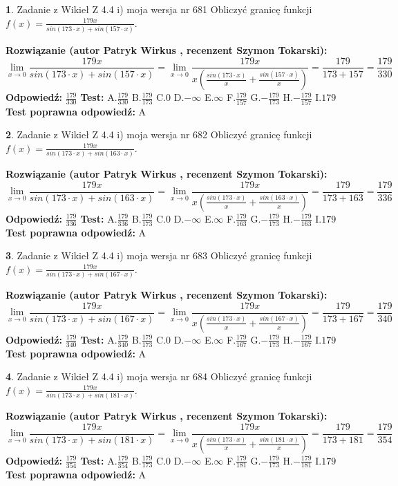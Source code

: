 \documentclass[12pt, a4paper]{article}
\theoremstyle{definition} %
\newtheorem{zad}{}
\newcommand{\zadStart}[1]{\begin{zad}#1\newline}
\newcommand{\zadStop}{\end{zad}}
\newcommand{\rozwStart}[2]{\noindent \textbf{Rozwiązanie (autor #1 , recenzent #2): }\newline}
\newcommand{\rozwStop}{\newline}
\newcommand{\odpStart}{\noindent \textbf{Odpowiedź:}\newline}
\newcommand{\odpStop}{\newline}
\newcommand{\testStart}{\noindent \textbf{Test:}\newline}
\newcommand{\testStop}{\newline}
\newcommand{\kluczStart}{\noindent \textbf{Test poprawna odpowiedź:}\newline}
\newcommand{\kluczStop}{\newline}
\begin{document}
\zadStart{Zadanie z Wikieł Z 4.4 i) moja wersja nr 681}
Obliczyć granicę funkcji $f(x)=\frac{179x}{sin(173\cdot x) +sin(157\cdot x)}$.
\zadStop
\rozwStart{Patryk Wirkus}{Szymon Tokarski}
$$\lim\limits_{x\to 0}\frac{179x}{sin(173\cdot x) +sin(157\cdot x)}=\lim\limits_{x\to 0}\frac{179x}{x(\frac{sin(173\cdot x)}{x}+\frac{sin(157\cdot x)}{x})}=\frac{179}{173+157} = \frac{179}{330}$$
\rozwStop
\odpStart
$\frac{179}{330}$
\odpStop
\testStart
A.$\frac{179}{330}$
B.$\frac{179}{173}$
C.$0$
D.$-\infty$
E.$\infty$
F.$\frac{179}{157}$
G.$-\frac{179}{173}$
H.$-\frac{179}{157}$
I.$179$
\testStop
\kluczStart
A
\kluczStop



\zadStart{Zadanie z Wikieł Z 4.4 i) moja wersja nr 682}
Obliczyć granicę funkcji $f(x)=\frac{179x}{sin(173\cdot x) +sin(163\cdot x)}$.
\zadStop
\rozwStart{Patryk Wirkus}{Szymon Tokarski}
$$\lim\limits_{x\to 0}\frac{179x}{sin(173\cdot x) +sin(163\cdot x)}=\lim\limits_{x\to 0}\frac{179x}{x(\frac{sin(173\cdot x)}{x}+\frac{sin(163\cdot x)}{x})}=\frac{179}{173+163} = \frac{179}{336}$$
\rozwStop
\odpStart
$\frac{179}{336}$
\odpStop
\testStart
A.$\frac{179}{336}$
B.$\frac{179}{173}$
C.$0$
D.$-\infty$
E.$\infty$
F.$\frac{179}{163}$
G.$-\frac{179}{173}$
H.$-\frac{179}{163}$
I.$179$
\testStop
\kluczStart
A
\kluczStop



\zadStart{Zadanie z Wikieł Z 4.4 i) moja wersja nr 683}
Obliczyć granicę funkcji $f(x)=\frac{179x}{sin(173\cdot x) +sin(167\cdot x)}$.
\zadStop
\rozwStart{Patryk Wirkus}{Szymon Tokarski}
$$\lim\limits_{x\to 0}\frac{179x}{sin(173\cdot x) +sin(167\cdot x)}=\lim\limits_{x\to 0}\frac{179x}{x(\frac{sin(173\cdot x)}{x}+\frac{sin(167\cdot x)}{x})}=\frac{179}{173+167} = \frac{179}{340}$$
\rozwStop
\odpStart
$\frac{179}{340}$
\odpStop
\testStart
A.$\frac{179}{340}$
B.$\frac{179}{173}$
C.$0$
D.$-\infty$
E.$\infty$
F.$\frac{179}{167}$
G.$-\frac{179}{173}$
H.$-\frac{179}{167}$
I.$179$
\testStop
\kluczStart
A
\kluczStop



\zadStart{Zadanie z Wikieł Z 4.4 i) moja wersja nr 684}
Obliczyć granicę funkcji $f(x)=\frac{179x}{sin(173\cdot x) +sin(181\cdot x)}$.
\zadStop
\rozwStart{Patryk Wirkus}{Szymon Tokarski}
$$\lim\limits_{x\to 0}\frac{179x}{sin(173\cdot x) +sin(181\cdot x)}=\lim\limits_{x\to 0}\frac{179x}{x(\frac{sin(173\cdot x)}{x}+\frac{sin(181\cdot x)}{x})}=\frac{179}{173+181} = \frac{179}{354}$$
\rozwStop
\odpStart
$\frac{179}{354}$
\odpStop
\testStart
A.$\frac{179}{354}$
B.$\frac{179}{173}$
C.$0$
D.$-\infty$
E.$\infty$
F.$\frac{179}{181}$
G.$-\frac{179}{173}$
H.$-\frac{179}{181}$
I.$179$
\testStop
\kluczStart
A
\kluczStop
\end{document}
